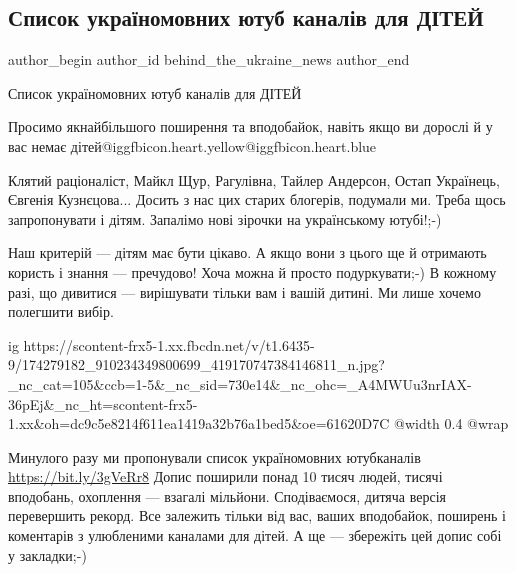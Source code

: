  
 
 
 
 

\subsection{Список україномовних ютуб каналів для ДІТЕЙ}
\label{sec:17_04_2021.fb.behind_the_ukraine_news.1.youtube_kanaly_deti_mova}

\ifcmt
 author_begin
   author_id behind_the_ukraine_news
 author_end
\fi

Список україномовних ютуб каналів для ДІТЕЙ

Просимо якнайбільшого поширення та вподобайок, навіть якщо ви дорослі й у вас
немає дітей@igg{fbicon.heart.yellow}@igg{fbicon.heart.blue}

Клятий раціоналіст, Майкл Щур, Рагулівна, Тайлер Андерсон, Остап Українець,
Євгенія Кузнєцова... Досить з нас цих старих блогерів, подумали ми. Треба щось
запропонувати і дітям. Запалімо нові зірочки на українському ютубі!;-)

Наш критерій — дітям має бути цікаво. А якщо вони з цього ще й отримають
користь і знання — пречудово! Хоча можна й просто подуркувати;-) В кожному
разі, що дивитися — вирішувати тільки вам і вашій дитині. Ми лише хочемо
полегшити вибір.

\ifcmt
  ig https://scontent-frx5-1.xx.fbcdn.net/v/t1.6435-9/174279182_910234349800699_419170747384146811_n.jpg?_nc_cat=105&ccb=1-5&_nc_sid=730e14&_nc_ohc=_A4MWUu3nrIAX-36pEj&_nc_ht=scontent-frx5-1.xx&oh=dc9c5e8214f611ea1419a32b76a1bed5&oe=61620D7C
  @width 0.4
  @wrap 
\fi

Минулого разу ми пропонували список україномовних ютубканалів
\url{https://bit.ly/3gVeRr8} Допис поширили понад 10 тисяч людей, тисячі вподобань,
охоплення — взагалі мільйони. Сподіваємося, дитяча версія перевершить рекорд.
Все залежить тільки від вас, ваших вподобайок, поширень і коментарів з
улюбленими каналами для дітей. А ще — збережіть цей допис собі у закладки;-)

